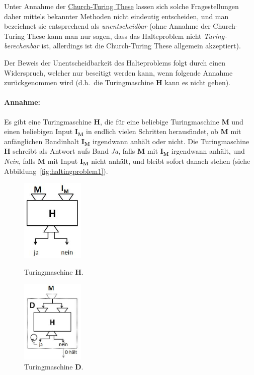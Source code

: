 Unter Annahme der \href{http://de.wikipedia.org/wiki/Church-Turing-These}{Church-Turing These} lassen sich solche Fragestellungen daher mittels bekannter Methoden nicht eindeutig entscheiden, und man bezeichnet sie entsprechend als \emph{unentscheidbar} (ohne Annahme der Church-Turing These kann man nur sagen, dass das Halteproblem nicht \emph{Turing-berechenbar} ist, allerdings ist die Church-Turing These allgemein akzeptiert).

Der Beweis der Unentscheidbarkeit des Halteproblems folgt durch einen Widerspruch, welcher nur beseitigt werden kann, wenn folgende Annahme zurückgenommen wird (d.h.\ die Turingmaschine $\mathbf{H}$ kann es nicht geben).

\paragraph{Annahme:} Es gibt eine Turingmaschine $\mathbf{H}$, die für eine beliebige Turingmaschine $\mathbf{M}$ und einen beliebigen Input $\mathbf{I_M}$ in endlich vielen Schritten herausfindet, ob $\mathbf{M}$ mit anfänglichen Bandinhalt $\mathbf{I_M}$ irgendwann anhält oder nicht. Die Turingmaschine $\mathbf{H}$ schreibt als Antwort aufs Band \emph{Ja}, falls $\mathbf{M}$ mit $\mathbf{I_M}$ irgendwann anhält, und \emph{Nein}, falls $\mathbf{M}$ mit Input $\mathbf{I_M}$ nicht anhält, und bleibt sofort danach stehen (siehe Abbildung~\ref{fig:haltingproblem1}).

\begin{figure}[h]
\begin{minipage}[h]{0.475\textwidth}
\centering
\includegraphics[width=3cm]{img/haltingproblem1.jpg}
    \caption{Turingmaschine $\mathbf{H}$.}
    \label{fig:haltingproblem1}
\end{minipage}
%
\begin{minipage}[h]{0.475\textwidth}
\centering
\includegraphics[width=3cm]{img/haltingproblem2.jpg}
    \caption{Turingmaschine $\mathbf{D}$.}
    \label{fig:haltingproblem2}
\end{minipage}
\end{figure}

